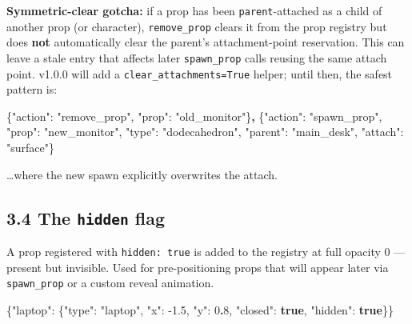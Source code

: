 \documentclass[
  11pt,
]{book}
\newenvironment{Shaded}{}{}
\newcommand{\DataTypeTok}[1]{\textcolor[rgb]{0.56,0.13,0.00}{#1}}
\newcommand{\DecValTok}[1]{\textcolor[rgb]{0.25,0.63,0.44}{#1}}
\newcommand{\ErrorTok}[1]{\textcolor[rgb]{1.00,0.00,0.00}{\textbf{#1}}}
\newcommand{\FloatTok}[1]{\textcolor[rgb]{0.25,0.63,0.44}{#1}}
\newcommand{\FunctionTok}[1]{\textcolor[rgb]{0.02,0.16,0.49}{#1}}
\newcommand{\KeywordTok}[1]{\textcolor[rgb]{0.00,0.44,0.13}{\textbf{#1}}}
\newcommand{\StringTok}[1]{\textcolor[rgb]{0.25,0.44,0.63}{#1}}
\begin{document}
\textbf{Symmetric-clear gotcha:} if a prop has been
\texttt{parent}-attached as a child of another prop (or character),
\texttt{remove\_prop} clears it from the prop registry but does
\textbf{not} automatically clear the parent's attachment-point
reservation. This can leave a stale entry that affects later
\texttt{spawn\_prop} calls reusing the same attach point. v1.0.0 will
add a \texttt{clear\_attachments=True} helper; until then, the safest
pattern is:

\begin{Shaded}
\begin{Highlighting}[]
\FunctionTok{\{}\DataTypeTok{"action"}\FunctionTok{:} \StringTok{"remove\_prop"}\FunctionTok{,} \DataTypeTok{"prop"}\FunctionTok{:} \StringTok{"old\_monitor"}\FunctionTok{\}}\ErrorTok{,}
\FunctionTok{\{}\DataTypeTok{"action"}\FunctionTok{:} \StringTok{"spawn\_prop"}\FunctionTok{,} \DataTypeTok{"prop"}\FunctionTok{:} \StringTok{"new\_monitor"}\FunctionTok{,}
 \DataTypeTok{"type"}\FunctionTok{:} \StringTok{"dodecahedron"}\FunctionTok{,}
 \DataTypeTok{"parent"}\FunctionTok{:} \StringTok{"main\_desk"}\FunctionTok{,} \DataTypeTok{"attach"}\FunctionTok{:} \StringTok{"surface"}\FunctionTok{\}}
\end{Highlighting}
\end{Shaded}

\ldots where the new spawn explicitly overwrites the attach.

\subsection{\texorpdfstring{3.4 The \texttt{hidden}
flag}{3.4 The hidden flag}}\label{the-hidden-flag-1}

A prop registered with \texttt{hidden:\ true} is added to the registry
at full opacity 0 --- present but invisible. Used for pre-positioning
props that will appear later via \texttt{spawn\_prop} or a custom reveal
animation.

\begin{Shaded}
\begin{Highlighting}[]
\FunctionTok{\{}\DataTypeTok{"laptop"}\FunctionTok{:} \FunctionTok{\{}\DataTypeTok{"type"}\FunctionTok{:} \StringTok{"laptop"}\FunctionTok{,} \DataTypeTok{"x"}\FunctionTok{:} \FloatTok{{-}1.5}\FunctionTok{,} \DataTypeTok{"y"}\FunctionTok{:} \DecValTok{0}\ErrorTok{.}\DecValTok{8}\FunctionTok{,}
            \DataTypeTok{"closed"}\FunctionTok{:} \KeywordTok{true}\FunctionTok{,} \DataTypeTok{"hidden"}\FunctionTok{:} \KeywordTok{true}\FunctionTok{\}\}}
\end{Highlighting}
\end{Shaded}
\end{document}
